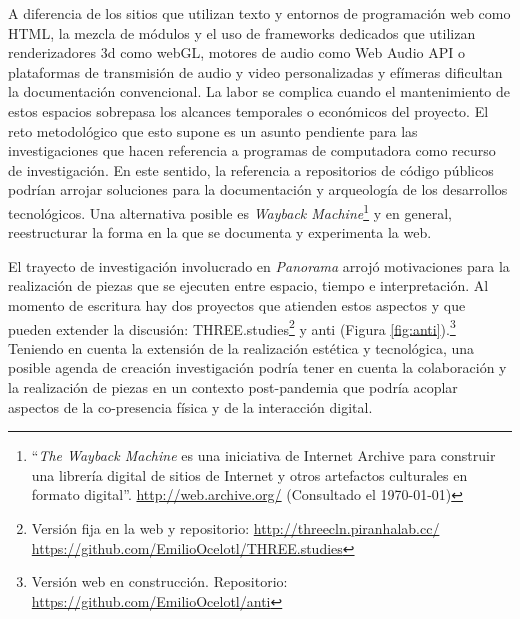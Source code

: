 A diferencia de los sitios que utilizan texto y entornos de programación web como HTML, la mezcla de módulos y el uso de frameworks dedicados que utilizan renderizadores 3d como webGL, motores de audio como Web Audio API o plataformas de transmisión de audio y video personalizadas y efímeras dificultan la documentación convencional. La labor se complica cuando el mantenimiento de estos espacios sobrepasa los alcances temporales o económicos del proyecto. El reto metodológico que esto supone es un asunto pendiente para las investigaciones que hacen referencia a programas de computadora como recurso de investigación. En este sentido, la referencia a repositorios de código públicos podrían arrojar soluciones para la documentación y arqueología de los desarrollos tecnológicos. Una alternativa posible es \textit{Wayback Machine}\footnote{``\textit{The Wayback Machine} es una iniciativa de Internet Archive para construir una librería digital de sitios de Internet y otros artefactos culturales en formato digital''. \url{http://web.archive.org/} (Consultado el \today)} y en general, reestructurar la forma en la que se documenta y experimenta la web. 


El trayecto de investigación involucrado en \textit{Panorama} arrojó motivaciones para la realización de piezas que se ejecuten entre espacio, tiempo e interpretación. Al momento de escritura hay dos proyectos que atienden estos aspectos y que pueden extender la discusión: THREE.studies\footnote{Versión fija en la web y repositorio: \url{http://threecln.piranhalab.cc/} \url{https://github.com/EmilioOcelotl/THREE.studies}} y anti (Figura \ref{fig:anti}).\footnote{Versión web en construcción. Repositorio: \url{https://github.com/EmilioOcelotl/anti}} Teniendo en cuenta la extensión de la realización estética y tecnológica, una posible agenda de creación investigación podría tener en cuenta la colaboración y la realización de piezas en un contexto post-pandemia que podría acoplar aspectos de la co-presencia física y de la interacción digital. 

